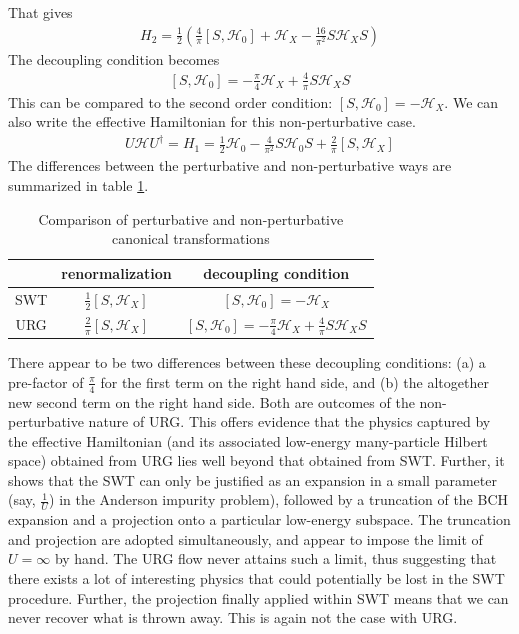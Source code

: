 \documentclass[twoside]{report}
\numberwithin{equation}{section}
\begin{document}
That gives
\begin{equation}\begin{aligned}
	H_2 = \frac{1}{2}\left(\frac{4}{\pi}\left[S,\mathcal{H}_0\right] + \mathcal{H}_X - \frac{16}{\pi^2}S \mathcal{H}_X S\right)
\end{aligned}\end{equation}
The decoupling condition becomes
\begin{equation}\begin{aligned}
	\left[S,\mathcal{H}_0\right] = -\frac{\pi}{4}\mathcal{H}_X + \frac{4}{\pi}S \mathcal{H}_X S
\end{aligned}\end{equation}
This can be compared to the second order condition: \(\left[S,\mathcal{H}_0\right] = -\mathcal{H}_X\). We  can also write the effective Hamiltonian for this non-perturbative case.
\begin{equation}\begin{aligned}
	U\mathcal{H} U^\dagger = H_1 = \frac{1}{2} \mathcal{H}_0 - \frac{4}{\pi^2}S\mathcal{H}_0 S  + \frac{2}{\pi}\left[S,\mathcal{H}_X\right]
\end{aligned}\end{equation}
The differences between the perturbative and non-perturbative ways are summarized in table \ref{comparison}.
\begin{table}
\centering
\begin{tabular}{|c|c|c|}
    \hline
        &renormalization&decoupling condition\\
    \hline
	SWT&\(\frac{1}{2} \left[S,\mathcal{H}_X\right]\)&\(\left[S,\mathcal{H}_0\right] = -\mathcal{H}_X\)\\
	URG&\(\frac{2}{\pi}\left[S,\mathcal{H}_X\right]\)&\(\left[S,\mathcal{H}_0\right] = -\frac{\pi}{4}\mathcal{H}_X + \frac{4}{\pi}S \mathcal{H}_X S\)\\
    \hline
\end{tabular}
    \caption{Comparison of perturbative and non-perturbative canonical transformations}
    \label{comparison}
\end{table}
There appear to be two differences between these decoupling conditions: (a)  a pre-factor of \(\frac{\pi}{4}\) for the first term on the right hand side, and (b) the altogether new second term on the right hand side. Both are outcomes of the non-perturbative nature of URG. This offers evidence that the physics captured by the effective Hamiltonian (and its associated low-energy many-particle Hilbert space) obtained from URG lies well beyond that obtained from SWT. Further, it shows that the SWT can only be justified as an expansion in a small parameter (say, $\frac{1}{U}$) in the Anderson impurity problem), followed by a truncation of the BCH expansion and a projection onto a particular low-energy subspace. The truncation and projection are adopted simultaneously, and appear to impose the limit of \(U = \infty\) by hand. The URG flow never attains such a limit, thus suggesting that there exists a lot of interesting physics that could potentially be lost in the SWT procedure. Further, the projection finally applied within SWT means that we can never recover what is thrown away. This is again not the case with URG.
\end{document}

